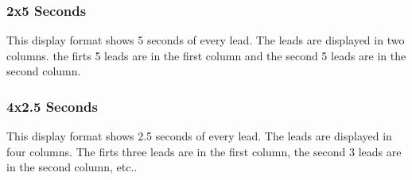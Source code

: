 		\subsubsection{2x5 Seconds}
		This display format shows 5 seconds of every lead. The leads are displayed in
		two columns. the firts 5 leads are in the first column and the second 5 leads
		are in the second column.\\
		
		\begin{minipage}{\textwidth} 
		\centering
		\label{fig:bild}
		\end{minipage}
		
		\subsubsection{4x2.5 Seconds}
		This display format shows 2.5 seconds of every lead. The leads are displayed
		in four columns. The firts three leads are in the first column, the second 3
		leads are in the second column, etc..\\
		
		\begin{minipage}{\textwidth} 
		\centering
		\label{fig:bild}
		\end{minipage}
		
